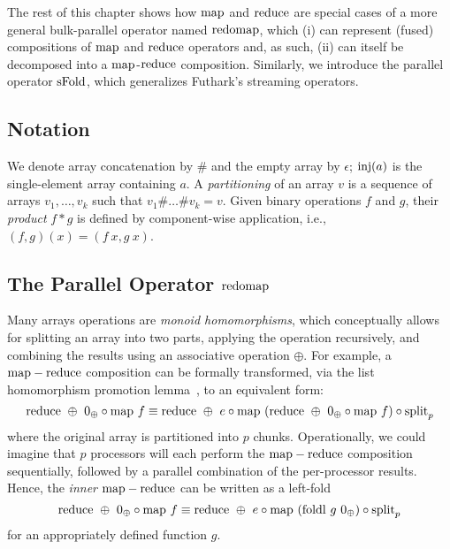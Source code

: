 
The rest of this chapter shows how $\mathrm{map}{}$ and $\mathrm{reduce}{}$ are
special cases of a more general bulk-parallel operator named
$\mathrm{redomap}{}$, which (i) can represent (fused) compositions of
$\mathrm{map}{}$ and $\mathrm{reduce}{}$ operators and, as such, (ii) can itself be
decomposed into a $\mathrm{map}{}$-$\mathrm{reduce}{}$ composition.  Similarly, we
introduce the parallel operator $\mathrm{sFold}{}$, which generalizes
Futhark's streaming operators.

\subsection{Notation}

We denote array concatenation by $\#$ and the empty array by $\epsilon$;
$\mathrm{inj}(a)$ is the single-element array containing $a$.
A \emph{partitioning} of an array $v$ is a sequence of arrays $v_1, \ldots, v_k$ such
that $v_1 \# \ldots \# v_k = v$.
%
Given binary operations $f$ and $g$, their \emph{product} $f * g$ is defined by
component-wise application, i.e., $(f, g) (x) = (f~x, g~x)$.
%
%

\subsection{The Parallel Operator $\mathrm{redomap}$}

Many arrays operations are \emph{monoid homomorphisms}, which
conceptually allows for splitting an array into two parts, applying
the operation recursively, and combining the results using an
associative operation $\oplus$.  For example, a $\mathrm{map}-\mathrm{reduce}$
composition can be formally transformed, via the list homomorphism
promotion lemma~\cite{BirdListTh}, to an equivalent form:
\[
  \mathrm{reduce}~\oplus~0_{\oplus} \circ \mathrm{map}~f \equiv \mathrm{reduce}~\oplus~e \circ \mathrm{map}~(\mathrm{reduce}~\oplus~0_{\oplus} \circ \mathrm{map}~f) \circ \textrm{split}_{p}
\]
where the original array is partitioned into $p$ chunks.
Operationally, we could imagine that $p$ processors will each perform
the $\mathrm{map}-\mathrm{reduce}$ composition sequentially, followed by a parallel
combination of the per-processor results.  Hence, the \textit{inner}
$\mathrm{map}-\mathrm{reduce}$ can be written as a left-fold
\[
  \mathrm{reduce}~\oplus~0_{\oplus} \circ \mathrm{map}~f \equiv \mathrm{reduce}~\oplus~e \circ \mathrm{map}~(\mathrm{foldl}~g~0_{\oplus}) \circ \textrm{split}_{p}
\]
for an appropriately defined function $g$.

